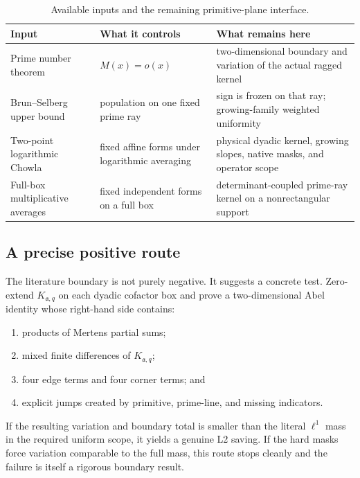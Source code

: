 \begin{table}[H]
\centering
\caption{Available inputs and the remaining primitive-plane interface.}
\label{tab:literature-boundary}
\small
\begin{tabular}{@{}>{\raggedright\arraybackslash}p{}
>{\raggedright\arraybackslash}p{}
>{\raggedright\arraybackslash}p{}@{}}
\toprule
Input & What it controls & What remains here \\
\midrule
Prime number theorem
& \(M(x)=o(x)\)
& two-dimensional boundary and variation of the actual ragged kernel \\
Brun--Selberg upper bound
& population on one fixed prime ray
& sign is frozen on that ray; growing-family weighted uniformity \\
Two-point logarithmic Chowla
& fixed affine forms under logarithmic averaging
& physical dyadic kernel, growing slopes, native masks, and operator scope \\
Full-box multiplicative averages
& fixed independent forms on a full box
& determinant-coupled prime-ray kernel on a nonrectangular support \\
\bottomrule
\end{tabular}
\end{table}

\subsection{A precise positive route}

The literature boundary is not purely negative.  It suggests a concrete
test.  Zero-extend \(K_{\mathfrak a,q}\) on each dyadic cofactor box and
prove a two-dimensional Abel identity whose right-hand side contains:
\begin{enumerate}[label=\textup{(\arabic*)},leftmargin=3em]
 \item products of Mertens partial sums;
 \item mixed finite differences of \(K_{\mathfrak a,q}\);
 \item four edge terms and four corner terms; and
 \item explicit jumps created by primitive, prime-line, and missing
       indicators.
\end{enumerate}
If the resulting variation and boundary total is smaller than the
literal \(\ell^1\) mass in the required uniform scope, it yields a genuine
L2 saving.  If the hard masks force variation comparable to the full
mass, this route stops cleanly and the failure is itself a rigorous
boundary result.
